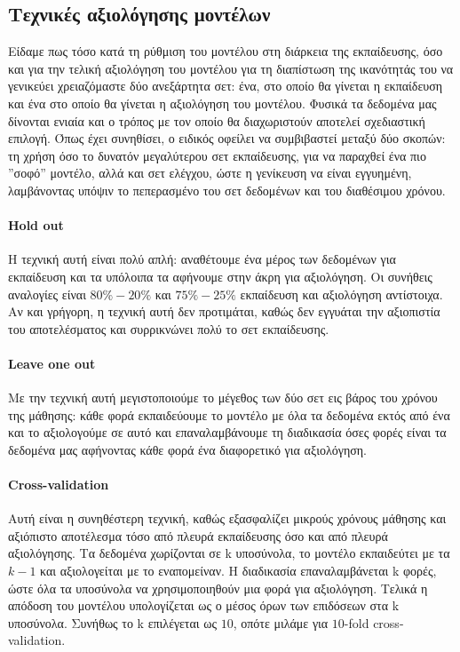 \documentclass{article}
\begin{document}
\subsection{Τεχνικές αξιολόγησης μοντέλων}
Είδαμε πως τόσο κατά τη ρύθμιση του μοντέλου στη διάρκεια της εκπαίδευσης, όσο και για την τελική αξιολόγηση του μοντέλου για τη διαπίστωση της ικανότητάς του να γενικεύει χρειαζόμαστε δύο ανεξάρτητα σετ: ένα, στο οποίο θα γίνεται η εκπαίδευση και ένα στο οποίο θα γίνεται η αξιολόγηση του μοντέλου. Φυσικά τα δεδομένα μας δίνονται ενιαία και ο τρόπος με τον οποίο θα διαχωριστούν αποτελεί σχεδιαστική επιλογή. Όπως έχει συνηθίσει, ο ειδικός οφείλει να συμβιβαστεί μεταξύ δύο σκοπών: τη
χρήση όσο το δυνατόν μεγαλύτερου σετ εκπαίδευσης, για να παραχθεί ένα πιο ”σοφό” μοντέλο, αλλά και σετ ελέγχου, ώστε η γενίκευση να είναι εγγυημένη, λαμβάνοντας υπόψιν το πεπερασμένο του σετ δεδομένων και του διαθέσιμου χρόνου.
\paragraph{Hold out} Η τεχνική αυτή είναι πολύ απλή: αναθέτουμε ένα μέρος των δεδομένων για εκπαίδευση και τα υπόλοιπα τα αφήνουμε στην άκρη για αξιολόγηση. Οι συνήθεις αναλογίες είναι $80\%-20\%$ και $75\%-25\%$ εκπαίδευση και αξιολόγηση αντίστοιχα. Αν και γρήγορη, η τεχνική αυτή δεν προτιμάται, καθώς δεν εγγυάται την αξιοπιστία του αποτελέσματος και συρρικνώνει πολύ το σετ εκπαίδευσης.
\paragraph{Leave one out} Με την τεχνική αυτή μεγιστοποιούμε το μέγεθος των δύο σετ εις βάρος του χρόνου της μάθησης: κάθε φορά εκπαιδεύουμε το μοντέλο με όλα τα δεδομένα εκτός από ένα και το αξιολογούμε σε αυτό και επαναλαμβάνουμε τη διαδικασία όσες φορές είναι τα δεδομένα μας αφήνοντας κάθε φορά ένα διαφορετικό για αξιολόγηση.
\paragraph{Cross-validation}Αυτή είναι η συνηθέστερη τεχνική, καθώς εξασφαλίζει μικρούς χρόνους μάθησης και αξιόπιστο αποτέλεσμα τόσο από πλευρά εκπαίδευσης όσο και από πλευρά αξιολόγησης. Τα δεδομένα χωρίζονται σε k υποσύνολα, το μοντέλο εκπαιδεύτει με τα $k-1$ και αξιολογείται με το εναπομείναν. Η διαδικασία επαναλαμβάνεται k φορές, ώστε όλα τα υποσύνολα να χρησιμοποιηθούν μια φορά για
αξιολόγηση. Τελικά η απόδοση του μοντέλου υπολογίζεται ως ο μέσος όρων των επιδόσεων στα k υποσύνολα. Συνήθως το k επιλέγεται ως $10$, οπότε μιλάμε για $10$-fold cross-validation. 
\end{document}
